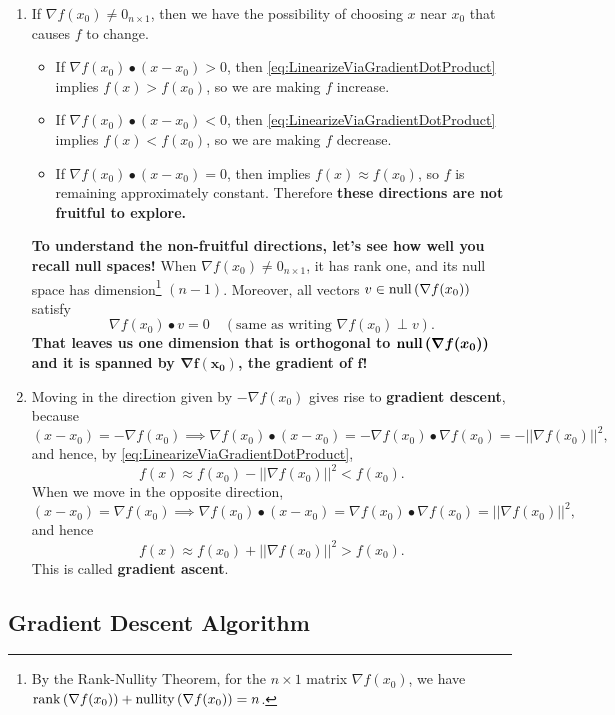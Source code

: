\begin{enumerate}
    \item If $\nabla f(x_0)\neq 0_{n \times 1}$, then we have the possibility of choosing $x$ near $x_0$ that causes $f$ to change. 
    \begin{itemize}
        \item  If $\nabla f(x_0) \bullet (x - x_0) > 0$, then \eqref{eq:LinearizeViaGradientDotProduct} implies $f(x)>f(x_0)$, so we are making $f$ increase.
        \item  If $\nabla f(x_0) \bullet (x - x_0) < 0$, then \eqref{eq:LinearizeViaGradientDotProduct} implies $f(x)<f(x_0)$, so we are making $f$ decrease.
        \item  If $\nabla f(x_0) \bullet (x - x_0) =0$, then  implies $f(x) \approx f(x_0)$, so $f$ is remaining approximately constant. Therefore \textbf{these directions are not fruitful to explore.}
    \end{itemize}
\textbf{To understand the non-fruitful directions, let's see how well you recall null spaces!} When $\nabla f(x_0) \neq 0_{n \times 1}$, it has rank one, and its null space has dimension\footnote{By the Rank-Nullity Theorem, for the $n \times 1$ matrix $\nabla f(x_0)$, we have $\mathrm{rank}\left(\nabla f(x_0)\right) + \mathrm{nullity}\left(\nabla f(x_0)\right) = n$.} $(n-1)$. Moreover, all vectors $v \in \mathrm{null}\left(\nabla f(x_0) \right)$ satisfy  
$$ \nabla f(x_0) \bullet v = 0 \quad (\text{same as writing }  \nabla f(x_0) \perp v).$$    
 \textbf{That leaves us one dimension that is orthogonal to $\bm{ \mathrm{null}\left( \nabla f(x_0) \right)}$ and it is spanned by $\bm{\nabla f(x_0)}$, the gradient of $\bm f$!} 
 \item Moving in the direction given by $ -\nabla f(x_0)$ gives rise to \textbf{gradient descent}, because
  $$ (x-x_0) = - \nabla f(x_0) \implies \nabla f(x_0) \bullet (x-x_0) = - \nabla f(x_0) \bullet \nabla f(x_0) = - ||\nabla f(x_0)||^2,$$
  and hence, by \eqref{eq:LinearizeViaGradientDotProduct},
  $$ f(x) \approx f(x_0) - ||\nabla f(x_0)||^2 < f(x_0).$$
 When we move in the opposite direction, 
  $$ (x-x_0) =  \nabla f(x_0) \implies \nabla f(x_0) \bullet (x-x_0) =  \nabla f(x_0) \bullet \nabla f(x_0) =  ||\nabla f(x_0)||^2, $$
  and hence 
  $$ f(x) \approx f(x_0) + ||\nabla f(x_0)||^2 > f(x_0).$$
  This is called \textbf{gradient ascent}.
\end{enumerate}
\vspace*{0.2cm}

\subsection{Gradient Descent Algorithm}
   
